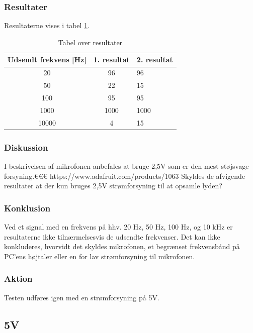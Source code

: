 		\subsubsection{Resultater}
		Resultaterne vises i tabel \ref{elektrettoresultater}. 
		\begin{table}[]
				\centering
				\caption{Tabel over resultater}
				\label{elektrettoresultater}
				\begin{tabular}{lll}
					\multicolumn{1}{l|}{\textbf{Udsendt frekvens {[}Hz{]}}} & 	
					\multicolumn{1}{l|}{\textbf{1. resultat}} & \textbf{2. resultat} \\ \hline
					\multicolumn{1}{c|}{20}& 
					\multicolumn{1}{c|}{96}&96\\
					\multicolumn{1}{c|}{50}& 
					\multicolumn{1}{c|}{22}&15\\
					\multicolumn{1}{c|}{100}& 
					\multicolumn{1}{c|}{95}&95\\
					\multicolumn{1}{c|}{1000}& 
					\multicolumn{1}{c|}{1000}&1000\\
					\multicolumn{1}{c|}{10000}& 
					\multicolumn{1}{c|}{4}&15\\
                   
				\end{tabular}
			\end{table}
		
		\subsubsection{Diskussion} 
		I beskrivelsen af mikrofonen anbefales at bruge 2,5V som er den mest støjsvage forsyning.€€€ https://www.adafruit.com/products/1063 Skyldes de afvigende resultater at der kun bruges 2,5V strømforsyning til at opsamle lyden?
		\subsubsection{Konklusion}
	Ved et signal med en frekvens på hhv. 20 Hz, 50 Hz, 100 Hz, og 10 kHz er resultaterne ikke tilnærmelsesvis de udsendte frekvenser. 
	Det kan ikke konkluderes, hvorvidt det skyldes mikrofonen, et begrænset frekvensbånd på PC'ens højtaler eller en for lav strømforsyning til mikrofonen. 
		\subsubsection{Aktion}
		Testen udføres igen med en strømforsyning på 5V. 
		
\subsection{\elektretto 5V}
